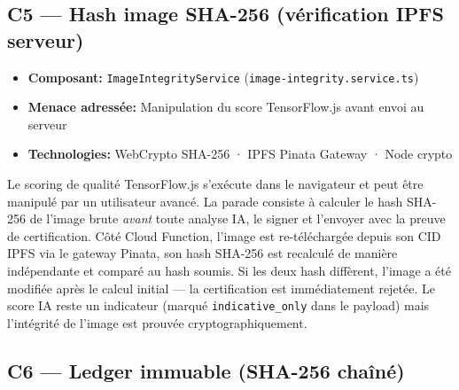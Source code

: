 \documentclass[12pt,a4paper]{report}
\begin{document}
\vspace{0.3cm}

\subsection{C5 — Hash image SHA-256 (vérification IPFS serveur)}

\begin{tcolorbox}[definbox,title={Couche C5 --- Hash image SHA-256}]
  \begin{itemize}[itemsep=5pt]
    \item \textbf{Composant:} \texttt{ImageIntegrityService} (\texttt{image-integrity.service.ts})
    \item \textbf{Menace adressée:} Manipulation du score TensorFlow.js avant envoi au serveur
    \item \textbf{Technologies:} WebCrypto SHA-256 · IPFS Pinata Gateway · Node crypto
  \end{itemize}
  \vspace{0.3cm}
  Le scoring de qualité TensorFlow.js s'exécute dans le navigateur et peut être manipulé par
  un utilisateur avancé. La parade consiste à calculer le hash SHA-256 de l'image brute
  \textit{avant} toute analyse IA, le signer et l'envoyer avec la preuve de certification.
  Côté Cloud Function, l'image est re-téléchargée depuis son CID IPFS via le gateway Pinata,
  son hash SHA-256 est recalculé de manière indépendante et comparé au hash soumis. Si les
  deux hash diffèrent, l'image a été modifiée après le calcul initial --- la certification
  est immédiatement rejetée. Le score IA reste un indicateur (marqué \texttt{indicative\_only}
  dans le payload) mais l'intégrité de l'image est prouvée cryptographiquement.
\end{tcolorbox}

\vspace{0.3cm}

\subsection{C6 — Ledger immuable (SHA-256 chaîné)}
\end{document}
